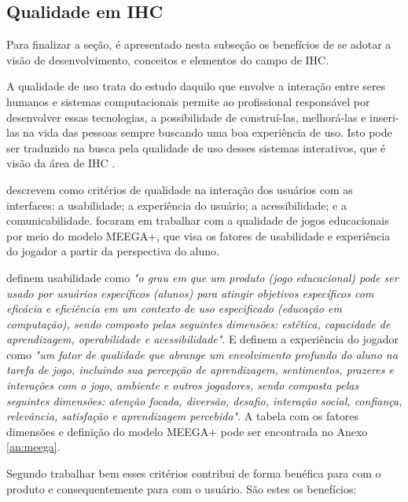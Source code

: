 \subsection{Qualidade em IHC}
\label{sub:quali}
Para finalizar a seção, é apresentado nesta subseção os benefícios de se adotar a visão de desenvolvimento, conceitos e elementos do campo de IHC.

A qualidade de uso trata do estudo daquilo que envolve a interação entre seres humanos e sistemas computacionais permite ao profissional responsável por desenvolver essas tecnologias, a possibilidade de construí-las, melhorá-las e inseri-las na vida das pessoas sempre buscando uma boa experiência de uso. Isto pode ser traduzido na busca pela qualidade de uso desses sistemas interativos, que é visão da área de IHC \cite[p. 13, 14]{barbosa_silva}.%

 descrevem como critérios de qualidade na interação dos usuários com as interfaces: a usabilidade; a experiência do usuário; a acessibilidade; e a comunicabilidade.  focaram em trabalhar com a qualidade de jogos educacionais por meio do modelo MEEGA+, que visa os fatores de usabilidade e experiência do jogador a partir da perspectiva do aluno. 

 definem usabilidade como \textit{"o grau em que um produto (jogo educacional) pode ser usado por usuários específicos (alunos) para atingir objetivos específicos com eficácia e eficiência em um contexto de uso especificado (educação em computação), sendo composto pelas seguintes dimensões: estética, capacidade de aprendizagem, operabilidade e acessibilidade"}. E definem a experiência do jogador como \textit{"um fator de qualidade que abrange um envolvimento profundo do aluno na tarefa de jogo, incluindo sua percepção de aprendizagem, sentimentos, prazeres e interações com o jogo, ambiente e outros jogadores, sendo composta pelas seguintes dimensões: atenção focada, diversão, desafio, interação social, confiança, relevância, satisfação e aprendizagem percebida"}. A tabela com os fatores dimensões e definição do modelo MEEGA+ pode ser encontrada no Anexo \ref{an:meega}. %

Segundo  trabalhar bem esses critérios contribui de forma benéfica para com o produto e consequentemente para com o usuário. São estes os benefícios: %

